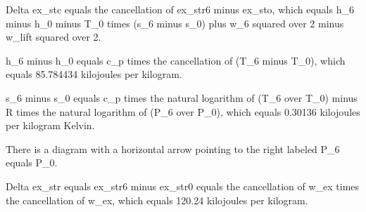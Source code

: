 Delta ex_stc equals the cancellation of ex_str6 minus ex_sto, which equals h_6 minus h_0 minus T_0 times (s_6 minus s_0) plus w_6 squared over 2 minus w_lift squared over 2.

h_6 minus h_0 equals c_p times the cancellation of (T_6 minus T_0), which equals 85.784434 kilojoules per kilogram.

s_6 minus s_0 equals c_p times the natural logarithm of (T_6 over T_0) minus R times the natural logarithm of (P_6 over P_0), which equals 0.30136 kilojoules per kilogram Kelvin.

There is a diagram with a horizontal arrow pointing to the right labeled P_6 equals P_0.

Delta ex_str equals ex_str6 minus ex_str0 equals the cancellation of w_ex times the cancellation of w_ex, which equals 120.24 kilojoules per kilogram.